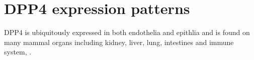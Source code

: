 \section{DPP4 expression patterns}
DPP4 is ubiquitously expressed in both endothelia and epithlia and is found on many mammal organs including kidney, liver, lung, intestines and immune system, .~\cite{Abbott1994,Shingu2003,Hong1989,Gutschmidt1981,Dikov2004,Bühling1995,Tanaka1992,Gorrell1991} 